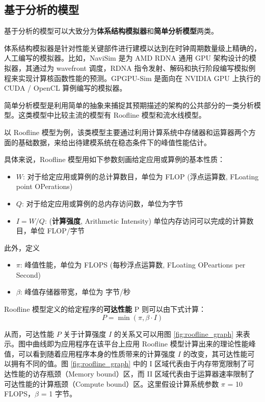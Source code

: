 \subsection{基于分析的模型}

基于分析的模型可以大致分为\textbf{体系结构模拟器}和\textbf{简单分析模型}两类。

体系结构模拟器是针对性能关键部件进行建模以达到在时钟周期数量级上精确的，人工编写的模拟器。比如，NaviSim \cite{10.1145/3559009.3569666} 是为 AMD RDNA 通用 GPU 架构设计的模拟器，其通过为 wavefront 调度，RDNA 指令发射、解码和执行阶段编写模拟例程来实现计算核函数性能的预测。GPGPU-Sim \cite{9138922, 4919648} 是面向在 NVIDIA GPU 上执行的 CUDA / OpenCL 算例编写的模拟器。

简单分析模型是利用简单的抽象来捕捉其预期描述的架构的公共部分的一类分析模型。这类模型中比较主流的模型有 Roofline 模型\cite{10.1145/1498765.1498785, KONSTANTINIDIS201737}和流水线模型\cite{LEMEIRE202332, 10289219, 10.1145/3524059.3532396}。 

以 Roofline 模型为例，该类模型主要通过利用计算系统中存储器和运算器两个方面的基础数据，来给出待建模系统在稳态条件下的峰值性能估计。

具体来说，Roofline 模型用如下参数刻画给定应用或算例的基本性质：

\begin{itemize}
    \item $W$: 对于给定应用或算例的总计算数目，单位为 FLOP (浮点运算数, FLoating point OPerations)
    \item $Q$: 对于给定应用或算例的总内存访问数，单位为字节
    \item $I = W/Q$: (\textbf{计算强度}, Arithmetic Intensity) 单位内存访问可以完成的计算数目，单位 FLOP/字节
\end{itemize}

此外，定义

\begin{itemize}
    \item $\pi$: 峰值性能，单位为 FLOPS (每秒浮点运算数, FLoating OPeartions per Second)
    \item $\beta$: 峰值存储器带宽，单位为 字节/秒
\end{itemize}

Roofline 模型定义的给定程序的\textbf{可达性能} P 则可以由下式计算：
$$
P = \min(\pi, \beta \cdot I)
$$

从而，可达性能 $ P $ 关于计算强度 $ I $ 的关系又可以用图 \ref{fig:roofline_graph} 来表示。图中曲线即为应用程序在该平台上应用 Roofline 模型计算出来的理论性能峰值，可以看到随着应用程序本身的性质带来的计算强度 $ I $ 的改变，其可达性能可以拥有不同的值。图 \ref{fig:roofline_graph} 中的 I 区域代表由于内存带宽限制了可达性能的访存瓶颈（Memory bound）区，而 II 区域代表由于运算器速率限制了可达性能的计算瓶颈（Compute bound）区。这里假设计算系统参数 $\pi$ = 10 FLOPS，$\beta$ = 1 字节。

